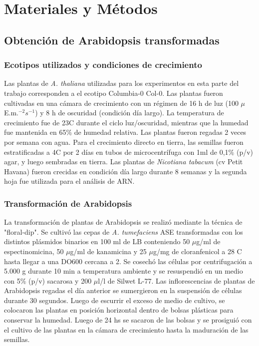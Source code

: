 \graphicspath{{Materials/Figs/}}

\setcounter{chapter}{3}
\chapter*{Materiales y Métodos} 
\setcounter{figure}{0}
\setcounter{section}{0}


\section{Obtención de Arabidopsis transformadas}

\subsection{Ecotipos utilizados y condiciones de crecimiento}
Las plantas de  \textit{A. thaliana} utilizadas para los experimentos en esta parte del trabajo corresponden a el ecotipo Columbia-0 Col-0.
Las plantas fueron cultivadas en una cámara de crecimiento con un régimen de 16 h de luz (100 $\mu$E.m.$^{-2}s^{-1}$) y 8 h de oscuridad (condición día largo).
La temperatura de crecimiento fue de 23\degree C durante el ciclo luz/oscuridad, mientras que la humedad fue mantenida en 65\% de humedad relativa.
Las plantas fueron regadas 2 veces por semana con agua.
Para el crecimiento directo en tierra, las semillas fueron estratificadas a 4\degree C por 2 días en tubos de microcentrífuga con 1ml de 0,1\% (p/v) agar, y luego sembradas en tierra.
Las plantas de \textit{Nicotiana tabacum} (cv Petit Havana) fueron crecidas en condición día largo durante 8 semanas y la segunda hoja fue utilizada para el análisis de ARN.

\subsection{Transformación de Arabidopsis}

La transformación de plantas de Arabidopsis se realizó mediante la técnica de "floral-dip".
Se cultivó las cepas de \textit{A. tumefaciens} ASE transformadas con los distintos plásmidos binarios en 100 ml de LB conteniendo 50 $\mu$g/ml de espectinomicina, 50 $\mu$g/ml de kanamicina y 25 $\mu$g/mg de cloranfenicol a 28 \degree C hasta llegar a una DO600 cercana a 2.
Se cosechó las células por centrifugación a 5.000 g durante 10 min a temperatura ambiente y se resuspendió en un medio con 5\% (p/v) sacarosa y 200 $\mu$l/l de Silwet L-77.
Las inflorescencias de plantas de Arabidopsis regadas el día anterior se sumergieron en la suspensión de células durante 30 segundos.
Luego de escurrir el exceso de medio de cultivo, se colocaron las plantas en posición horizontal dentro de bolsas plásticas para conservar la humedad.
Luego de 24 hs se sacaron de las bolsas y se prosiguió con el cultivo de las plantas en la cámara de crecimiento hasta la maduración de las semillas.


